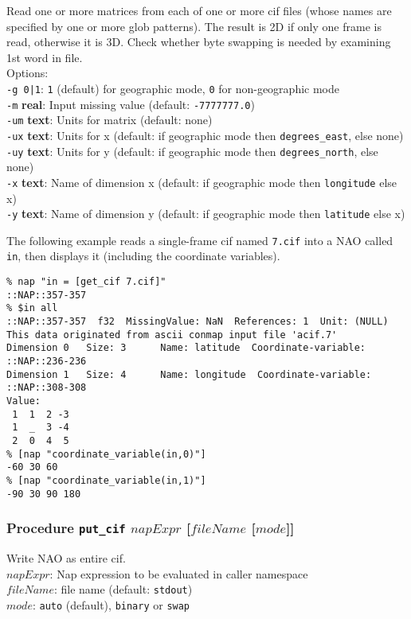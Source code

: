   Read one or more matrices from each of one or more cif files
  (whose names are specified by one or more glob patterns). The result
  is 2D if only one frame is read, otherwise it is 3D. Check whether
  byte swapping is needed by examining 1st word in file.
  \\Options:
  \\
  \texttt{-g 0|1}: 
  \texttt{1} (default) for geographic mode, 
  \texttt{0} for non-geographic mode
  \\
  \texttt{-m} 
  \textbf{real}: Input missing value (default: 
  \texttt{-7777777.0})
  \\
  \texttt{-um} 
  \textbf{text}: Units for matrix (default: none)
  \\
  \texttt{-ux} 
  \textbf{text}: Units for x (default: if geographic mode then 
  \texttt{degrees\_east}, else none)
  \\
  \texttt{-uy} 
  \textbf{text}: Units for y (default: if geographic mode then 
  \texttt{degrees\_north}, else none)
  \\
  \texttt{-x} 
  \textbf{text}: Name of dimension x (default: if geographic mode then 
  \texttt{longitude} else x)
  \\
  \texttt{-y} 
  \textbf{text}: Name of dimension y (default: if geographic mode then 
  \texttt{latitude} else x)
  

The following example reads a single-frame cif named 
  \texttt{7.cif} into a NAO called 
  \texttt{in}, then displays it (including the coordinate
  variables).
  \begin{verbatim}
% nap "in = [get_cif 7.cif]"
::NAP::357-357
% $in all
::NAP::357-357  f32  MissingValue: NaN  References: 1  Unit: (NULL)
This data originated from ascii conmap input file 'acif.7'
Dimension 0   Size: 3      Name: latitude  Coordinate-variable: ::NAP::236-236
Dimension 1   Size: 4      Name: longitude  Coordinate-variable: ::NAP::308-308
Value:
 1  1  2 -3
 1  _  3 -4
 2  0  4  5
% [nap "coordinate_variable(in,0)"]
-60 30 60
% [nap "coordinate_variable(in,1)"]
-90 30 90 180
\end{verbatim}

\subsubsection{Procedure \texttt{put\_cif} $napExpr$ [$\mathit{fileName}$ [$\mathit{mode}$]]}
    \label{bin-io-put-cif}

  Write NAO as entire cif.
  \\
  $napExpr$: Nap expression to be evaluated in caller
  namespace
  \\
  $\mathit{fileName}$: file name (default: 
  \texttt{stdout})
  \\
  $\mathit{mode}$: 
  \texttt{auto} (default), 
  \texttt{binary} or 
  \texttt{swap}

